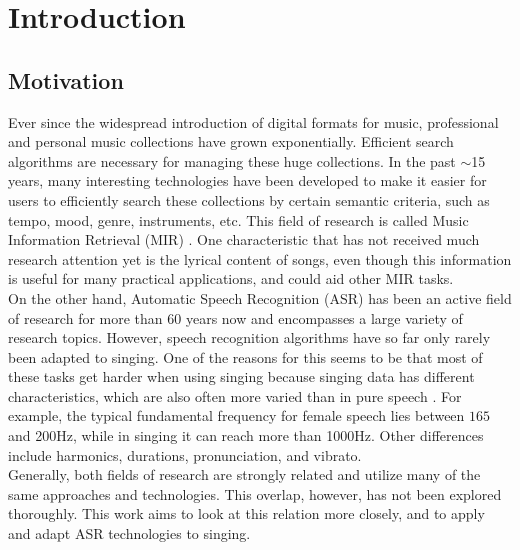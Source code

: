 \chapter{Introduction} \label{chap:introduction}
\section{Motivation}\label{sec:intro_motivation}

Ever since the widespread introduction of digital formats for music, professional and personal music collections have grown exponentially. Efficient search algorithms are necessary for managing these huge collections. In the past $\sim$15 years, many interesting technologies have been developed to make it easier for users to efficiently search these collections by certain semantic criteria, such as tempo, mood, genre, instruments, etc. This field of research is called Music Information Retrieval (MIR) \cite{incollection:mir}. One characteristic that has not received much research attention yet is the lyrical content of songs, even though this information is useful for many practical applications, and could aid other MIR tasks.\\

On the other hand, Automatic Speech Recognition (ASR) has been an active field of research for more than 60 years now \cite{juang_rabiner_history} and encompasses a large variety of research topics. However, speech recognition algorithms have so far only rarely been adapted to singing. One of the reasons for this seems to be that most of these tasks get harder when using singing because singing data has different characteristics, which are also often more varied than in pure speech \cite{loscos}. For example, the typical fundamental frequency for female speech lies between $165$ and 200Hz, while in singing it can reach more than 1000Hz. Other differences include harmonics, durations, pronunciation, and vibrato.\\

Generally, both fields of research are strongly related and utilize many of the same approaches and technologies. This overlap, however, has not been explored thoroughly. This work aims to look at this relation more closely, and to apply and adapt ASR technologies to singing.\\

